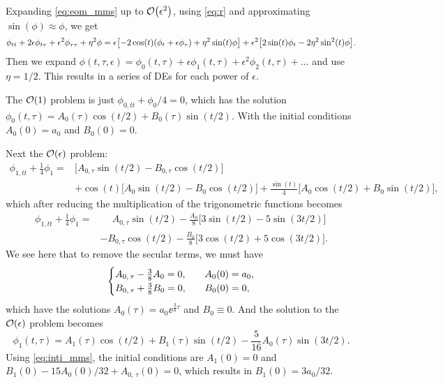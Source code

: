 Expanding \eqref{eq:eom_mms} up to $\order{\epsilon^2}$, using
\eqref{eq:r} and approximating $\sin(\phi)\approx\phi$, we get
\begin{equation}
\phi_{tt}+2\epsilon\phi_{t\tau}+\epsilon^2\phi_{\tau\tau}+\eta^2\phi
=%
\epsilon\qty[-2\cos(t)(\phi_t+\epsilon\phi_\tau)+\eta^2\sin(t)\phi]
+\epsilon^2\qty[2\sin(t)\phi_t-2\eta^2\sin^2(t)\phi].
\end{equation}
Then we expand 
$\phi(t,\tau,\epsilon)=\phi_0(t,\tau)+
\epsilon\phi_1(t,\tau)+\epsilon^2\phi_2(t,\tau)+\ldots$ and use
$\eta=1/2$. This results in a series of DEs for each power of
$\epsilon$. 

The $\order{1}$ problem is just $\phi_{0,tt}+\phi_0/4=0$, which has the
solution
$\phi_0(t,\tau)=A_0(\tau)\cos(t/2)+B_0(\tau)\sin(t/2)$.
With the initial conditions $A_0(0)=a_0$ and $B_0(0)=0$.

Next the $\order{\epsilon}$ problem: 
\begin{equation}
\begin{aligned}
\phi_{1, tt}+\frac{1}{4}\phi_1=&\Big[A_{0,\tau}\sin(t/2)-B_{0, \tau}\cos(t/2)\Big]\\
&+\cos(t)\Big[A_0\sin(t/2)-B_0\cos(t/2)\Big]
+\frac{\sin(t)}{4}\Big[A_0\cos(t/2)+B_0\sin(t/2)\Big],
\end{aligned}
\end{equation}
which after reducing the multiplication of the trigonometric functions
becomes
\begin{equation}
\begin{aligned}
\phi_{1, tt}+\frac{1}{4}\phi_1=&\phantom{+}A_{0,\tau}\sin(t/2)
-\frac{A_0}{8}\Big[3\sin(t/2)-5\sin(3t/2)\Big]\\
&{-}B_{0, \tau}\cos(t/2)
-\frac{B_0}{8}\Big[3\cos(t/2)+5\cos(3t/2)\Big].
\end{aligned}
\end{equation}
We see here that to remove the secular terms, we must have
\begin{equation}
\begin{cases}
A_{0,\,\tau}-\frac{3}{8}A_0=0\qcomma&A_0(0)=a_0,\\
B_{0,\,\tau}+\frac{3}{8}B_0=0\qcomma&B_0(0)=0,
\end{cases}
\end{equation}
which have the solutions $A_0(\tau)=a_0\ee^{\frac{3}{8}\tau}$ and
$B_0\equiv0$. And the solution to the $\order{\epsilon}$ problem
becomes
\begin{equation}
\phi_1(t, \tau)=A_1(\tau)\cos(t/2)+B_1(\tau)\sin(t/2)
-\frac{5}{16}A_0(\tau)\sin(3t/2).
\end{equation}
Using \eqref{eq:inti_mms}, the initial conditions are $A_1(0)=0$ and
$B_1(0)-15A_0(0)/32 + A_{0,\,\tau}(0)=0$, which results in $B_1(0)=3a_0/32$.

